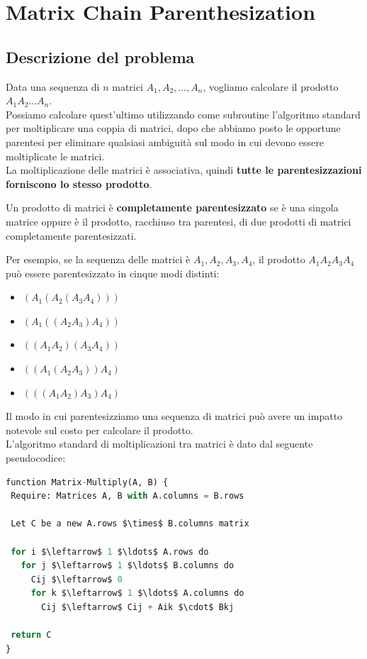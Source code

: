 \chapter{Matrix Chain Parenthesization}

\section{Descrizione del problema}

Data una sequenza di $n$ matrici $A_1, A_2, \ldots, A_n$, vogliamo
calcolare il prodotto $A_1A_2 \ldots A_n$.\\

Possiamo calcolare quest'ultimo utilizzando come subroutine l'algoritmo
standard per moltiplicare una coppia di matrici, dopo che abbiamo posto
le opportune parentesi per eliminare qualsiasi ambiguità sul modo in cui
devono essere moltiplicate le matrici.\\ La moltiplicazione delle matrici
è associativa, quindi \textbf{tutte le parentesizzazioni forniscono lo
  stesso prodotto}.

\begin{definition}
  Un prodotto di matrici è \textbf{completamente
    parentesizzato} se è una singola matrice oppure è il prodotto, racchiuso
  tra parentesi, di due prodotti di matrici completamente parentesizzati.
\end{definition}

Per esempio, se la sequenza delle matrici è $A_1, A_2, A_3, A_4$, il
prodotto $A_1 A_2 A_3 A_4$ può essere parentesizzato in cinque modi
distinti:
\begin{itemize}
  \item $(A_1 (A_2 (A_3 A_4)))$
  \item $(A_1 ((A_2 A_3) A_4))$
  \item $((A_1 A_2 )(A_3 A_4))$
  \item $((A_1 (A_2 A_3 ))A_4)$
  \item $(((A_1 A_2) A_3 )A_4)$
\end{itemize}

Il modo in cui parentesizziamo una sequenza di matrici può avere un
impatto notevole sul costo per calcolare il prodotto.\\

L'algoritmo standard di moltiplicazioni tra matrici è dato dal seguente
pseudocodice:

\begin{lstlisting}[language=Python, mathescape=true]
function Matrix-Multiply(A, B) {
 Require: Matrices A, B with A.columns = B.rows

 Let C be a new A.rows $\times$ B.columns matrix

 for i $\leftarrow$ 1 $\ldots$ A.rows do
   for j $\leftarrow$ 1 $\ldots$ B.columns do
     Cij $\leftarrow$ 0
     for k $\leftarrow$ 1 $\ldots$ A.columns do
       Cij $\leftarrow$ Cij + Aik $\cdot$ Bkj

 return C
}
\end{lstlisting}

